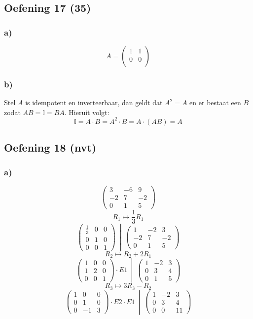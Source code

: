 \documentclass[lineaire_algebra_oplossingen.tex]{subfiles}
\begin{document}
\subsection{Oefening 17 (35)}
\subsubsection*{a)}
\[
A= \left(\begin{array} {cc}
    1 & 1\\
    0 & 0\\
\end{array} \right)
\]

\subsubsection*{b)}
Stel $A$ is idempotent en inverteerbaar, dan geldt dat $A^2 = A$ en er bestaat een $B$ zodat $AB = \mathbb{I} = BA$. Hieruit volgt:
\[
\mathbb{I} = A \cdot B = A^2 \cdot B = A \cdot (AB) = A
\]
\subsection{Oefening 18 (nvt)}
\subsubsection*{a)}
\[
\begin{pmatrix}
3 & -6 & 9\\
-2 & 7 & -2\\
0 & 1 & 5
\end{pmatrix}
\]
\[ R_1 \longmapsto \frac{1}{3} R_1 \]
\[
\left.\begin{pmatrix}
\frac{1}{3} & 0 & 0\\
0 & 1 & 0\\
0 & 0 & 1
\end{pmatrix}
\ \middle|\ 
\begin{pmatrix}
1 & -2 & 3\\
-2 & 7 & -2\\
0 & 1 & 5
\end{pmatrix}\right.
\]
\[ R_2 \longmapsto R_2 + 2R_1 \]
\[
\left.\begin{pmatrix}
1 & 0 & 0\\
1 & 2 & 0\\
0 & 0 & 1
\end{pmatrix}
\cdot E1
\ \middle|\ 
\begin{pmatrix}
1 & -2 & 3\\
0 & 3 & 4\\
0 & 1 & 5
\end{pmatrix}\right.
\]
\[ R_3 \longmapsto 3R_3 - R_2 \]
\[
\left.\begin{pmatrix}
1 & 0 & 0\\
0 & 1 & 0\\
0 & -1 & 3
\end{pmatrix}
\cdot E2 \cdot E1
\ \middle|\ 
\begin{pmatrix}
1 & -2 & 3\\
0 & 3 & 4\\
0 & 0 & 11
\end{pmatrix}\right.
\]
\end{document}
